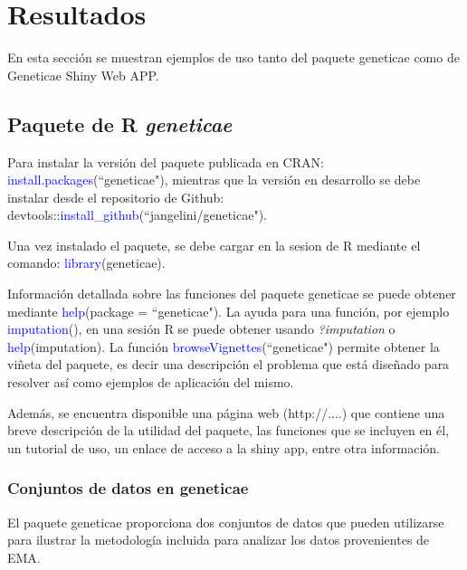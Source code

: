 

\chapter{Resultados}

En esta sección se muestran ejemplos de uso tanto del paquete geneticae como de Geneticae Shiny Web APP. 

\section{Paquete de R \emph{geneticae}}

Para instalar la versión del paquete publicada en CRAN: \textcolor{blue}{install.packages}(``geneticae"), mientras que la versión en desarrollo se debe instalar desde el repositorio de Github: devtools::\textcolor{blue}{install\_github}(``jangelini/geneticae"). 

Una vez instalado el paquete, se debe cargar en la sesion de R mediante el comando: \textcolor{blue}{library}(geneticae). 

Información detallada sobre las funciones del paquete geneticae se puede obtener mediante \textcolor{blue}{help}(package = ``geneticae"). La ayuda para una función, por ejemplo \textcolor{blue}{imputation}(), en una sesión R se puede obtener usando \emph{?imputation} o \textcolor{blue}{help}(imputation). La función \textcolor{blue}{browseVignettes}(``geneticae") permite obtener la viñeta del paquete, es decir una descripción el problema que está diseñado para resolver así como ejemplos de aplicación del mismo. 

Además, se encuentra disponible una página web (http://....) que contiene una breve descripción de la utilidad del paquete, las funciones que se incluyen en él, un tutorial de uso, un enlace de acceso a la shiny app, entre otra información.


\subsection{Conjuntos de datos en geneticae}

El paquete geneticae proporciona dos conjuntos de datos que pueden utilizarse para ilustrar la metodología incluida para analizar los datos provenientes de EMA. 

